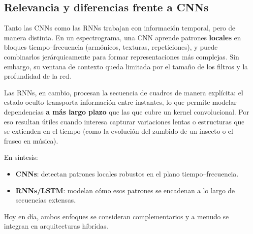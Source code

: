 \subsection{Relevancia y diferencias frente a CNNs}

Tanto las CNNs como las RNNs trabajan con información temporal, pero de manera distinta.  
En un espectrograma, una CNN aprende patrones \textbf{locales} en bloques tiempo–frecuencia (armónicos, texturas, repeticiones), 
y puede combinarlos jerárquicamente para formar representaciones más complejas.  
Sin embargo, su ventana de contexto queda limitada por el tamaño de los filtros y la profundidad de la red.

Las RNNs, en cambio, procesan la secuencia de cuadros de manera explícita: el estado oculto transporta información entre instantes, 
lo que permite modelar dependencias \textbf{a más largo plazo} que las que cubre un kernel convolucional.  
Por eso resultan útiles cuando interesa capturar variaciones lentas o estructuras que se extienden en el tiempo 
(como la evolución del zumbido de un insecto o el fraseo en música).

En síntesis:
\begin{itemize}
	\item \textbf{CNNs}: detectan patrones locales robustos en el plano tiempo–frecuencia.  
	\item \textbf{RNNs/LSTM}: modelan cómo esos patrones se encadenan a lo largo de secuencias extensas.  
\end{itemize}

Hoy en día, ambos enfoques se consideran complementarios y a menudo se integran en arquitecturas híbridas.
